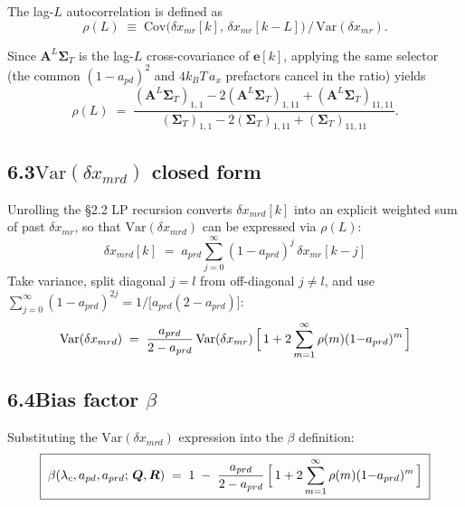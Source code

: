 \documentclass[11pt]{article}
\newcommand{\lc}{\lambda_c}
\begin{document}
The lag-$L$ autocorrelation is defined as
\begin{equation}
\rho(L) \;\equiv\; \mathrm{Cov}\bigl(\delta x_{mr}[k],\, \delta x_{mr}[k\!-\!L]\bigr) \,/\, \mathrm{Var}(\delta x_{mr}).
\end{equation}

Since $\bm{A}^{L}\bm{\Sigma}_T$ is the lag-$L$ cross-covariance of $\bm{e}[k]$, applying the same selector (the common $(1-a_{pd})^2$ and $4 k_B T\,a_x$ prefactors cancel in the ratio) yields
\begin{equation}
\rho(L) \;=\; \frac{(\bm{A}^{L}\bm{\Sigma}_T)_{1,1} - 2(\bm{A}^{L}\bm{\Sigma}_T)_{1,11} + (\bm{A}^{L}\bm{\Sigma}_T)_{11,11}}
                     {(\bm{\Sigma}_T)_{1,1} - 2(\bm{\Sigma}_T)_{1,11} + (\bm{\Sigma}_T)_{11,11}}.
\end{equation}

\subsection*{6.3\quad $\mathrm{Var}(\delta x_{mrd})$ closed form}

Unrolling the \S2.2 LP recursion converts $\delta x_{mrd}[k]$ into an explicit weighted sum of past $\delta x_{mr}$, so that $\mathrm{Var}(\delta x_{mrd})$ can be expressed via $\rho(L)$:
\begin{equation}
\delta x_{mrd}[k] \;=\; a_{prd}\sum_{j=0}^{\infty}(1{-}a_{prd})^{j}\,\delta x_{mr}[k\!-\!j]
\end{equation}
Take variance, split diagonal $j\!=\!l$ from off-diagonal $j\!\neq\!l$, and use
$\sum_{j=0}^{\infty}(1{-}a_{prd})^{2j} = 1/\bigl[a_{prd}(2{-}a_{prd})\bigr]$:
\begin{equation}
\mathrm{Var}(\delta x_{mrd}) \;=\; \frac{a_{prd}}{2 - a_{prd}}\,\mathrm{Var}(\delta x_{mr})\,\Bigl[\,1 + 2\sum_{m=1}^{\infty}\rho(m)(1{-}a_{prd})^{m}\,\Bigr]
\end{equation}

\subsection*{6.4\quad Bias factor $\beta$}

Substituting the $\mathrm{Var}(\delta x_{mrd})$ expression into the $\beta$ definition:
\begin{equation}
\boxed{\;\beta(\lc, a_{pd}, a_{prd};\, \bm{Q}, \bm{R}) \;=\; 1 \;-\; \frac{a_{prd}}{2 - a_{prd}}\,\Bigl[\,1 + 2\sum_{m=1}^{\infty}\rho(m)(1{-}a_{prd})^{m}\,\Bigr]\;}
\end{equation}
\end{document}
